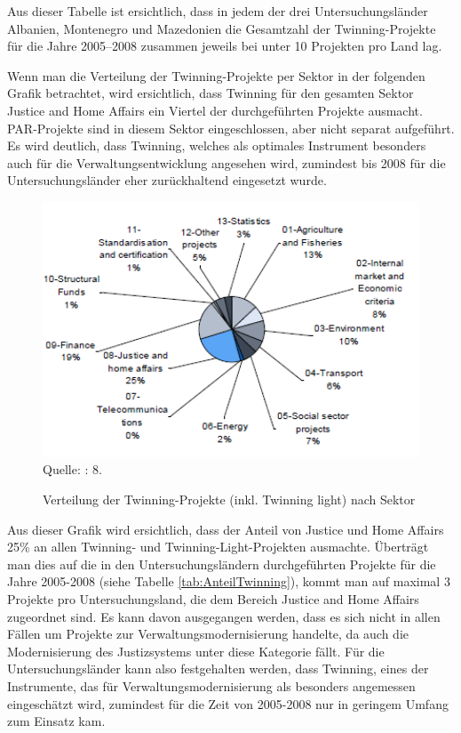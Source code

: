 Aus dieser Tabelle ist ersichtlich, dass in jedem der drei Untersuchungsländer Albanien, Montenegro und Mazedonien die Gesamtzahl der Twinning-Projekte für die Jahre 2005–2008 zusammen jeweils bei unter 10 Projekten pro Land lag.\par
Wenn man die Verteilung der Twinning-Projekte per Sektor in der folgenden Grafik betrachtet, wird ersichtlich, dass Twinning für den gesamten Sektor Justice and Home Affairs ein Viertel der durchgeführten Projekte ausmacht. PAR-Projekte sind in diesem Sektor eingeschlossen, aber nicht separat aufgeführt. Es wird deutlich, dass Twinning, welches als optimales Instrument besonders auch für die Verwaltungsentwicklung angesehen wird, zumindest bis 2008 für die Untersuchungsländer eher zurückhaltend eingesetzt wurde.
\begin{figure}[H]
  \centering
\setlength\belowcaptionskip{10pt}
\caption{Verteilung der Twinning-Projekte (inkl. Twinning light) nach Sektor}
  \includegraphics[width=4.5in]{Material/TwinningProjects}\\
Quelle: \cite{epec11} : 8.
\end{figure}
Aus dieser Grafik wird ersichtlich, dass der Anteil von Justice und Home Affairs 25\% an allen Twinning- und Twinning-Light-Projekten ausmachte. Überträgt man dies auf die in den Untersuchungsländern durchgeführten Projekte für die Jahre 2005-2008 (siehe Tabelle \ref{tab:AnteilTwinning}), kommt man auf maximal 3 Projekte pro Untersuchungsland, die dem Bereich Justice and Home Affairs zugeordnet sind. Es kann davon ausgegangen werden, dass es sich nicht in allen Fällen um Projekte zur Verwaltungsmodernisierung handelte, da auch die Modernisierung des Justizsystems unter diese Kategorie fällt. Für die Untersuchungsländer kann also festgehalten werden, dass Twinning, eines der Instrumente, das für Verwaltungsmodernisierung als besonders angemessen eingeschätzt wird, zumindest für die Zeit von 2005-2008 nur in geringem Umfang zum Einsatz kam.
